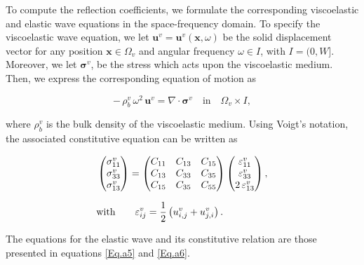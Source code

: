 \documentclass[draft]{agujournal2019}
\begin{document}
To compute the reflection coefficients, we formulate the corresponding viscoelastic and elastic wave equations in the space-frequency domain. To specify the viscoelastic wave equation,  we let $\bm{u}^v =\bm{u}^v( \bm{x}, \omega)$  be the solid displacement vector for any position $\bm{x} \in \Omega_v$  and angular frequency $\omega \in I$, with $I =(0,W]$. Moreover, we let $\bm {\sigma}^v$, be the stress which acts upon the viscoelastic medium. Then, we express the corresponding equation of motion as
\begin{linenomath*}
\begin{equation}\label{Eq.b1}
- \, \rho_b^v \,\omega^2 \, \bm{u}^v = \nabla  \cdot \bm{\sigma}^v \quad  \textrm{in} \quad \Omega_v \times I, 
\end{equation}
\end{linenomath*}
where $\rho_b^v$ is the bulk density of the viscoelastic medium. Using Voigt's notation, the associated constitutive equation can be written as
\begin{linenomath*}
\begin{equation}\label{Eq.b2}
\setlength{\jot}{10pt}
\begin{split}
 &
 \begin{pmatrix}
 \sigma_{11}^v\\
 \sigma_{33}^v \\
  \sigma_{13}^v\\
 \end{pmatrix}
 =
   \begin{pmatrix}
  {C}_{11} & {C}_{13} & {C}_{15} \\
  {C}_{13} & {C}_{33} & {C}_{35} \\
  {C}_{15} & {C}_{35} & {C}_{55}\\
 \end{pmatrix}
  \begin{pmatrix}
  \varepsilon_{11}^v \\
  \varepsilon_{33}^v  \\
 2\,  \varepsilon_{13}^v \\
 \end{pmatrix},\\
 & \text{with} \qquad \varepsilon_{ij}^v =\frac{1}{2} \left(u_{i,j}^v + u_{j,i}^v\right).
 \end{split}
\end{equation}
\end{linenomath*}

The equations for the elastic wave and its constitutive relation are those presented in equations \eqref{Eq.a5} and \eqref{Eq.a6}.
\end{document}
